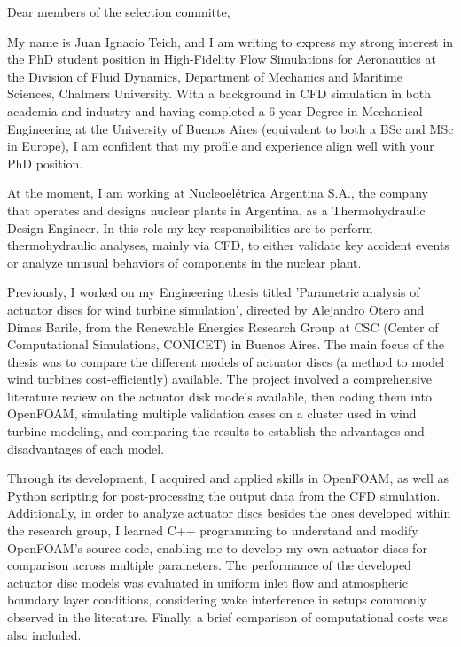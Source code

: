 \documentclass{letter}
\newcommand{\thesisname}{Parametric analysis of actuator discs for wind turbine simulation\xspace}
\newcommand{\phdtitle}{PhD student position in High-Fidelity Flow Simulations for Aeronautics\xspace}
\begin{document}
\begin{letter}{}
\opening{Dear members of the selection committe,}

My name is Juan Ignacio Teich, and I am writing to express my strong interest in the \phdtitle at the Division of Fluid Dynamics, Department of Mechanics and Maritime Sciences, Chalmers University.  
  With a background in CFD simulation in both academia and industry and having completed a 6 year Degree in Mechanical Engineering at the University of Buenos Aires (equivalent to both a BSc and MSc in Europe), I am confident that my profile and experience align well with your PhD position.

At the moment, I am working at Nucleoelétrica Argentina S.A., the company that operates and designs nuclear plants in Argentina, as a Thermohydraulic Design Engineer. In this role my key responsibilities are to perform thermohydraulic analyses, mainly via CFD, to either validate key accident events or analyze unusual behaviors of components in the nuclear plant. 

Previously, I worked on my Engineering thesis titled '\thesisname', directed by Alejandro Otero and Dimas Barile, from the Renewable Energies Research Group at CSC (Center of Computational Simulations, CONICET) in Buenos Aires. 
    The main focus of the thesis was to compare the different models of actuator discs (a method to model wind turbines cost-efficiently) available. 
  The project involved a comprehensive literature review on the actuator disk models available, then coding them into OpenFOAM, simulating multiple validation cases on a cluster used in wind turbine modeling, and comparing the results to establish the advantages and disadvantages of each model.  

Through its development, I acquired and applied skills in OpenFOAM, as well as Python scripting for post-processing the output data from the CFD simulation.
    Additionally, in order to analyze actuator discs besides the ones developed within the research group, I learned C++ programming to understand and modify OpenFOAM’s source code, enabling me to develop my own actuator discs for comparison across multiple parameters.
The performance of the developed actuator disc models was evaluated in uniform inlet flow and atmospheric boundary layer conditions, considering wake interference in setups commonly observed in the literature. Finally, a brief comparison of computational costs was also included.


\end{letter}
\end{document}
